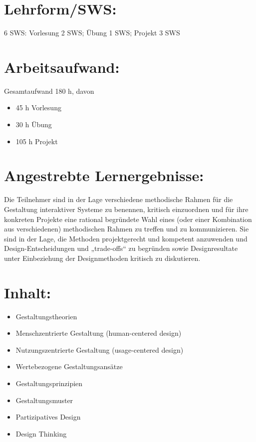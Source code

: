 \section*{Lehrform/SWS:}\label{lehrformsws-4}

6 SWS: Vorlesung 2 SWS; Übung 1 SWS; Projekt 3 SWS

\section*{Arbeitsaufwand:}\label{arbeitsaufwand-10}

Gesamtaufwand 180 h, davon

\begin{itemize}
\item
  45 h Vorlesung
\item
  30 h Übung
\item
  105 h Projekt
\end{itemize}

\section*{Angestrebte
Lernergebnisse:}\label{angestrebte-lernergebnisse-4}

Die Teilnehmer sind in der Lage verschiedene methodische Rahmen für die
Gestaltung interaktiver Systeme zu benennen, kritisch einzuordnen und
für ihre konkreten Projekte eine rational begründete Wahl eines (oder
einer Kombination aus verschiedenen) methodischen Rahmen zu treffen und
zu kommunizieren. Sie sind in der Lage, die Methoden projektgerecht und
kompetent anzuwenden und Design-Entscheidungen und „trade-offs`` zu
begründen sowie Designresultate unter Einbeziehung der Designmethoden
kritisch zu diskutieren.

\section*{Inhalt:}\label{inhalt-4}

\begin{itemize}
\item
  Gestaltungstheorien
\item
  Menschzentrierte Gestaltung (human-centered design)
\item
  Nutzungszentrierte Gestaltung (usage-centered design)
\item
  Wertebezogene Gestaltungsansätze
\item
  Gestaltungsprinzipien
\item
  Gestaltungsmuster
\item
  Partizipatives Design
\item
  Design Thinking
\end{itemize}

